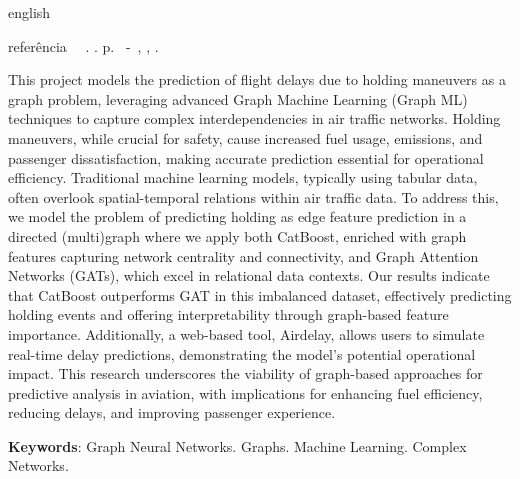 \begin{resumo}[Abstract]
  \begin{otherlanguage*}{english}
	\begin{flushleft}
      \setlength{\absparsep}{0pt} %
      referência \SingleSpacing
      \imprimirautorabr~~\textbf{\imprimirtituloresumo}. \imprimirdata. \pageref{LastPage}p.
      \imprimirtipotrabalho~-~\imprimirinstituicao,
      \imprimirlocal, \imprimirdata.
 	\end{flushleft} \OnehalfSpacing

    This project models the prediction of flight delays due to holding
    maneuvers as a graph problem, leveraging advanced Graph Machine
    Learning (Graph ML) techniques to capture complex interdependencies in
    air traffic networks. Holding maneuvers, while crucial for safety,
    cause increased fuel usage, emissions, and passenger dissatisfaction,
    making accurate prediction essential for operational
    efficiency. Traditional machine learning models, typically using
    tabular data, often overlook spatial-temporal relations within air
    traffic data. To address this, we model the problem of predicting
    holding as edge feature prediction in a directed (multi)graph where we
    apply both CatBoost, enriched with graph features capturing network
    centrality and connectivity, and Graph Attention Networks (GATs),
    which excel in relational data contexts. Our results indicate that
    CatBoost outperforms GAT in this imbalanced dataset, effectively
    predicting holding events and offering interpretability through
    graph-based feature importance. Additionally, a web-based tool,
    Airdelay, allows users to simulate real-time delay predictions,
    demonstrating the model's potential operational impact. This research
    underscores the viability of graph-based approaches for predictive
    analysis in aviation, with implications for enhancing fuel efficiency,
    reducing delays, and improving passenger experience.

    \vspace{\onelineskip}

    \noindent \textbf{Keywords}: Graph Neural Networks. Graphs. Machine
    Learning. Complex Networks.
  \end{otherlanguage*}
\end{resumo}
